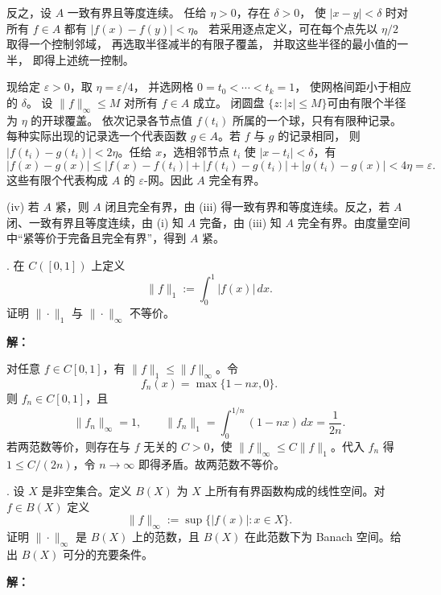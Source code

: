 \documentclass{article}
\begin{document}
反之，设 $A$ 一致有界且等度连续。
任给 $\eta>0$，存在 $\delta>0$，
使 $|x-y|<\delta$ 时对所有 $f\in A$ 都有 $|f(x)-f(y)|<\eta$。
若采用逐点定义，可在每个点先以 $\eta/2$ 取得一个控制邻域，
再选取半径减半的有限子覆盖，
并取这些半径的最小值的一半，
即得上述统一控制。

现给定 $\varepsilon>0$，取 $\eta=\varepsilon/4$，
并选网格 $0=t_0<\cdots<t_k=1$，
使网格间距小于相应的 $\delta$。
设 $\|f\|_\infty\le M$ 对所有 $f\in A$ 成立。
闭圆盘 $\{z:|z|\le M\}$可由有限个半径为 $\eta$ 的开球覆盖。
依次记录各节点值 $f(t_i)$ 所属的一个球，只有有限种记录。
每种实际出现的记录选一个代表函数 $g\in A$。若 $f$ 与 $g$ 的记录相同，
则 $|f(t_i)-g(t_i)|<2\eta$。任给 $x$，选相邻节点 $t_i$ 使 $|x-t_i|<\delta$，有
\[
|f(x)-g(x)|\le|f(x)-f(t_i)|+|f(t_i)-g(t_i)|+|g(t_i)-g(x)|<4\eta=\varepsilon.
\]
这些有限个代表构成 $A$ 的 $\varepsilon$-网。因此 $A$ 完全有界。

(iv) 若 $A$ 紧，则 $A$ 闭且完全有界，由 (iii) 得一致有界和等度连续。反之，若 $A$ 闭、一致有界且等度连续，由 (i) 知 $A$ 完备，由 (iii) 知 $A$ 完全有界。由度量空间中“紧等价于完备且完全有界”，得到 $A$ 紧。


\par\medskip

\par\medskip{}. 在 $C([0,1])$ 上定义
\[
\|f\|_1:=\int_0^1|f(x)|\,dx.
\]
证明 $\|\cdot\|_1$ 与 $\|\cdot\|_\infty$ 不等价。


\par{}\noindent\textbf{解：}\par\nopagebreak[4]


对任意 $f\in C[0,1]$，有 $\|f\|_1\le\|f\|_\infty$。令
\[
f_n(x)=\max\{1-nx,0\}.
\]
则 $f_n\in C[0,1]$，且
\[
\|f_n\|_\infty=1,\qquad
\|f_n\|_1=\int_0^{1/n}(1-nx)\,dx=\frac1{2n}.
\]
若两范数等价，则存在与 $f$ 无关的 $C>0$，使 $\|f\|_\infty\le C\|f\|_1$。代入 $f_n$ 得 $1\le C/(2n)$，令 $n\to\infty$ 即得矛盾。故两范数不等价。


\par\medskip

\par\medskip{}. 设 $X$ 是非空集合。定义 $B(X)$ 为 $X$ 上所有有界函数构成的线性空间。对 $f\in B(X)$ 定义
\[
\|f\|_\infty:=\sup\{|f(x)|:x\in X\}.
\]
证明 $\|\cdot\|_\infty$ 是 $B(X)$ 上的范数，且 $B(X)$ 在此范数下为 Banach 空间。给出 $B(X)$ 可分的充要条件。


\par{}\noindent\textbf{解：}\par\nopagebreak[4]
\end{document}
